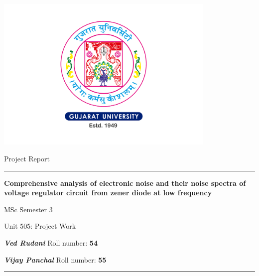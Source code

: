 



\parbox[h]{.8\textwidth}{\centering
\parbox[h]{.75\textwidth}{\centering\includegraphics[width=300pt]{GUlogo.pdf}}
    \parbox[b]{.75\textwidth}{\centering\Huge Project Report \par}\vskip10pt
    \parbox[b]{.75\textwidth}{\centering\hrule height 2pt \vskip50pt\Huge\textbf{Comprehensive analysis of electronic noise and their noise spectra of voltage regulator circuit from zener diode at low frequency}\par}\vskip50pt
   \parbox[b]{.75\textwidth}{\centering \LARGE MSc Semester $3$}\vskip7pt
    \parbox[b]{.75\textwidth}{\centering \large Unit 505:  Project Work}\vskip30pt 

    \parbox[b]{.75\textwidth}{\centering\normalsize \textbf{\emph{Ved Rudani}}   Roll number: \textbf{54}\par}\vskip2pt
    \parbox[b]{.75\textwidth}{\centering\normalsize \textbf{\emph{Vijay Panchal}}  Roll number: \textbf{55}\par \vskip50pt\hrule height 2pt}\vskip10pt
   }

